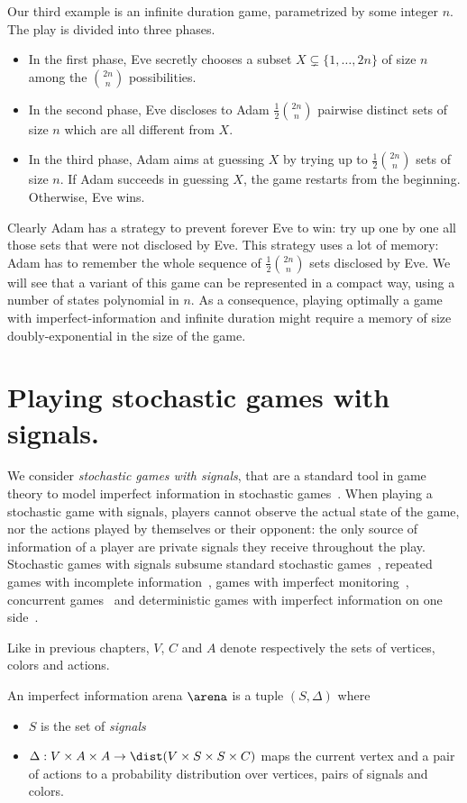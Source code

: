 Our third example is an infinite duration game,
parametrized by some integer $n$.
The play is
divided into three phases.
\begin{itemize}
\item
In the first phase, Eve secretly chooses a subset
$X \subsetneq \{1, \ldots,2n\}$ of size $n$
among the $\binom{2n}{n}$ possibilities.
\item
In the second phase, Eve discloses to Adam
$\frac{1}{2}\binom{2n}{n}$ pairwise distinct sets of size
$n$ which are all different from $X$. 
\item
In the third phase, Adam aims at guessing $X$ by trying up to
$\frac{1}{2} \binom{2n}{n}$ sets of size $n$. 
If Adam succeeds in guessing $X$,
the game restarts from the beginning. Otherwise, 
Eve wins.
\end{itemize}

Clearly Adam has a strategy to prevent forever
Eve to win: try up one by one all those sets
that were not disclosed by Eve.
This strategy uses a lot of memory:
Adam has to remember the whole sequence of $\frac{1}{2} \binom{2n}{n}$
 sets disclosed by Eve.
We will see that a variant of this game can be represented 
in a compact way, using a number of states polynomial in $n$.
As a consequence,
playing optimally a game with imperfect-information and infinite duration
might require a memory of size doubly-exponential in the size of the game.


\section{\label{subsec:formalimp}Playing stochastic games with signals.}
We consider \emph{stochastic games with
  signals}, that are a standard tool in game theory to model {imperfect information in stochastic games}~\cite{sorinafirst,dinahnicolas1,renault2}.
When playing a stochastic game with signals, players cannot observe
the actual state of the game, nor the actions played by themselves or
their opponent: the only source of information of a player are private
signals they receive throughout the play.  Stochastic games with
signals subsume standard stochastic games~\cite{shapley}, repeated
games with incomplete information~\cite{aumann}, games with imperfect
monitoring~\cite{dinahnicolas1}, concurrent games~\cite{dAH00} and
deterministic games with imperfect information on one
side~\cite{reif,chdr07}.

Like in previous chapters, $V$, $C$ and $A$  
denote respectively the sets
	of vertices, colors and actions.
\begin{definition}
An imperfect information arena $\arena$ is a tuple $(S,\Delta)$ where 
\begin{itemize}
	\item $S$ is the set of \emph{signals}
	\item $\Delta : V \times A \times A \to \dist(V \times S \times S \times C)$
	 maps the current vertex and a pair of actions to a probability distribution
	 over vertices, pairs of signals and colors.
\end{itemize}
\end{definition}


